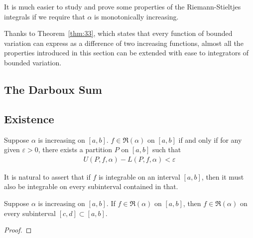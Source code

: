 \documentclass[thmcnt=section, 12pt]{elegantbook}
\begin{document}
\par It is much easier to study and prove some properties of the Riemann-Stieltjes integrals if we require that $\alpha$ is monotonically increasing. 

\par Thanks to Theorem~\ref{thm:33}, which states that every function of bounded variation can express as a difference of two increasing functions, almost all the properties introduced in this section can be extended with ease to integrators of bounded variation. 


\subsection{The Darboux Sum}


\subsection{Existence}


\begin{theorem} \label{thm:4}
    Suppose $\alpha$ is increasing on $[a, b]$. $f \in \mathfrak{R}(\alpha)$ on $[a, b]$ if and only if for any given $\varepsilon > 0$, there exists a partition $P$ on $[a, b]$ such that 
    \begin{align*}
        U(P, f, \alpha) - L(P, f, \alpha) < \varepsilon
    \end{align*}
\end{theorem}


\par It is natural to assert that if $f$ is integrable on an interval $[a, b]$, then it must also be integrable on every subinterval contained in that.

\begin{theorem} \label{thm:38}
    Suppose $\alpha$ is increasing on $[a, b]$. If $f \in \mathfrak{R}(\alpha)$ on $[a, b]$, then $f \in \mathfrak{R}(\alpha)$ on every subinterval $[c, d] \subset [a, b]$.
\end{theorem}

\begin{proof}
\end{proof}

\end{document}

